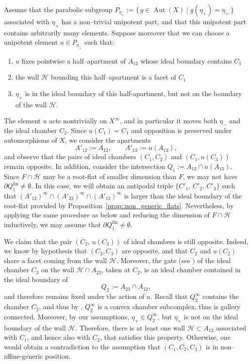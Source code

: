 \documentclass[11pt]{amsart}
\DeclareMathOperator{\Aut}{Aut}
\theoremstyle{plain}
\theoremstyle{definition}
\theoremstyle{remark}
\begin{document}
	
	Assume that the parabolic subgroup \(P_{\eta_{+}} := \{\, g \in \Aut(X) \mid g(\eta_{+}) = \eta_{+} \,\}\)
	associated with \(\eta_{+}\) has a non--trivial unipotent part, and that this 
	unipotent part contains arbitrarily many elements. Suppose moreover that we can choose a unipotent element
	\(u \in P_{\eta_{+}}\) such that:
	\begin{enumerate}
		\item \(u\) fixes pointwise a half--apartment of \(A_{12}\) whose ideal 
		boundary contains \(C_{1}\)
		\item the wall $\mathcal{H}$ bounding this half--apartment is a facet of \(C_{1}\)
		\item $\eta_+$ is in the ideal boundary of this half-apartment, but not on the boundary of the wall $\mathcal{H}$.
	\end{enumerate}
	
	The element \(u\) acts nontrivially on \(X^{\infty}\), and in particular it 
	moves both \(\eta_{-}\) and the ideal chamber \(C_{2}\). Since 
	\(u(C_{1}) = C_{1}\) and opposition is preserved under automorphisms of \(X\), 
	we consider the apartments
	\[
	A'_{12} := A_{12}, \qquad A'_{13} := u(A_{13}),
	\]
	and observe that the pairs of ideal chambers \((C_{1}, C_{2})\) and 
	\((C_{1}, u(C_{3}))\) remain opposite. In addition, consider the intersection \(Q_{1} := A_{12} \cap u(A_{13})\).  
	Since \(F \cap \mathcal{H}\) may be a root-flat of smaller dimension than \(F\), 
	we may not have \(\partial Q_{1}^{\mathrm{fin}} \neq \emptyset\).  In this case, we will obtain an antipodal triple $\{C'_1,\, C'_2,\, C'_3\}$ such that $(A'_{12})^\infty \cap (A'_{23})^\infty \cap (A'_{13})^\infty$ is larger than the ideal boundary of the root-flat provided by Proposition~\ref{prop::non_generic_flats}.
	Nevertheless, by applying the same procedure as below and reducing the dimension of \(F \cap \mathcal{H}\) inductively, we may assume that \(\partial Q_{1}^{\mathrm{fin}} \neq \emptyset\).
	
	We claim that the pair \((C_{2},\, u(C_{3}))\) of ideal chambers is still opposite. 
	Indeed, we know by hypothesis that \((C_{2}, C_{3})\) are opposite, and that 
	\(C_{2}\) and \(u(C_{2})\) share a facet coming from the wall \(\mathcal{H}\). 
	Moreover, the gate (see \cite[Definition 3.104 and Proposition 3.105]{abramenko_brown08}) of the ideal chamber \(C_{3}\) on the wall 
	\(\mathcal{H} \cap A_{23}\), taken at \(C_{2}\), is an ideal chamber contained in the 
	ideal boundary of 
	\[
	Q_{2} := A_{23} \cap A_{12},
	\]
	and therefore remains fixed under the action of \(u\).  Recall that $Q_{2}^\infty$ contains the chamber $C_2$, and thus by \cite[Proposition 4.115]{abramenko_brown08}, $Q_{2}^\infty$ is a convex chamber subcomplex, thus is gallery connected. Moreover, by our assumptions, $\eta_+ \in Q_{2}^\infty$, but $\eta_+$ is not on the ideal boundary of the wall $\mathcal{H}$.  Therefore, there is at least one wall \(\mathcal{H} \subset A_{12}\) associated with \(C_{1}\), and hence also with \(C_{2}\), that satisfies this property.  Otherwise, one would obtain a contradiction to the assumption that \((C_{1}, C_{2}, C_{3})\) is in non--affine-generic position.
	
\end{document}
